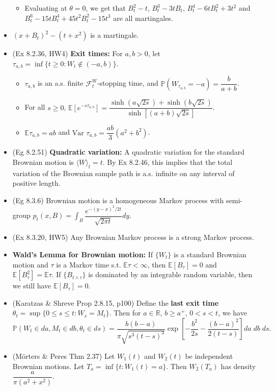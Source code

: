 \documentclass[twoside]{article}
\newcommand{\dis}{\displaystyle}
\newcommand\bbE{\mathbb{E}}
\newcommand\bbP{\mathbb{P}}
\newcommand\bbR{\mathbb{R}}
\newcommand\calF{\mathcal{F}}
\def\t{\theta}
\newcommand\var{\text{Var }}
\begin{document}
\begin{itemize}
\begin{itemize}
\item Evaluating at $\t = 0$, we get that $B_t^2 - t$, $B_t^3 - 3tB_t$, $B_t^4 - 6tB_t^2 + 3t^2$ and $B_t^6 - 15tB_t^4 + 45t^2B_t^2 - 15t^3$ are all martingales.
\end{itemize}

\item $(x + B_t)^2 - (t+x^2)$ is a martingale.

\item (Ex 8.2.36, HW4) \textbf{Exit times:} For $a,b > 0$, let $\tau_{a,b} = \inf \{t \geq 0: W_t \notin (-a, b) \}$.
\begin{itemize}
\item $\tau_{a,b}$ is an a.s. finite $\calF_t^W$-stopping time, and $\bbP \left(W_{\tau_{a,b}} = -a \right) = \dfrac{b}{a+b}$.

\item For all $s \geq 0$, $\bbE [e^{-s \tau_{a,b}}] = \dfrac{\sinh (a\sqrt{2s}) + \sinh(b\sqrt{2s})}{\sinh [(a+b)\sqrt{2s}]}$.

\item $\bbE \tau_{a,b} = ab$ and $\var \tau_{a,b} = \dfrac{ab}{3}(a^2 + b^2)$.
\end{itemize}

\item (Eg 8.2.51) \textbf{Quadratic variation:} A quadratic variation for the standard Brownian motion is $\langle W \rangle_t = t$. By Ex 8.2.46, this implies that the total variation of the Brownian sample path is a.s. infinite on any interval of positive length.

\item (Eg 8.3.6) Brownian motion is a homogeneous Markov process with semi-group $p_t(x, B) = \dis\int_B \dfrac{e^{-(y-x)^2/2t}}{\sqrt{2\pi t}} dy$.

\item (Ex 8.3.20, HW5) Any Brownian Markov process is a strong Markov process.

\item \textbf{Wald's Lemma for Brownian motion:} If $\{W_t\}$ is a standard Brownian motion and $\tau$ is a Markov time s.t. $\bbE \tau < \infty$, then $\bbE [B_\tau] = 0$ and $\bbE [B_\tau^2] = \bbE \tau$. If $\{B_{t \wedge \tau} \}$ is dominated by an integrable random variable, then we still have $\bbE [B_\tau] = 0$.

\item (Karatzas \& Shreve Prop 2.8.15, p100) Define the \textbf{last exit time} $\t_t = \sup \{ 0 \leq s \leq t: W_s = M_t \}$. Then for $a \in \bbR$, $b \geq a^+$, $0 < s < t$, we have
\[ \bbP (W_t \in da, M_t \in db, \t_t \in ds) = \frac{b(b-a)}{\pi \sqrt{s^3(t-s)^3}}\exp \left[-\frac{b^2}{2s} - \frac{(b-a)^2}{2(t-s)} \right] da\; db\; ds. \]

\item (M\"{o}rters \& Peres Thm 2.37) Let $W_1(t)$ and $W_2(t)$ be independent Brownian motions. Let $T_a = \inf \{ t: W_1(t) = a\}$. Then $W_2(T_a)$ has density $\dfrac{a}{\pi(a^2 + x^2)}$.

\end{itemize}
\end{document}
